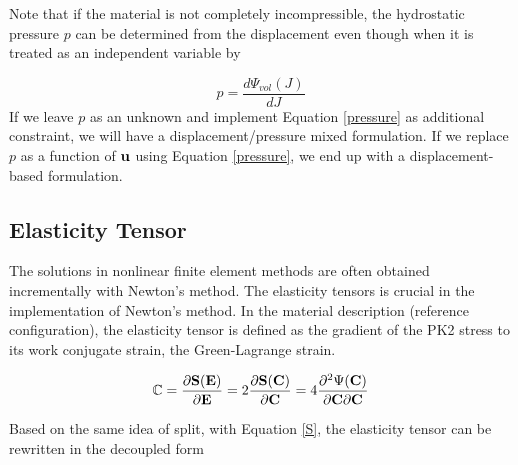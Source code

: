 Note that if the material is not completely incompressible, the hydrostatic pressure $p$ can be determined from the displacement even though when it is treated as an independent variable by

\begin{equation} \label{pressure}
p = \frac{d\Psi_{vol}(J)}{dJ}
\end{equation}
If we leave $p$ as an unknown and implement Equation \ref{pressure} as additional constraint, we will have a displacement/pressure mixed formulation. If we replace $p$ as a function of $\bold{u}$ using Equation \ref{pressure}, we end up with a displacement-based formulation.

%
\subsection{Elasticity Tensor} \label{general_elasticity}
The solutions in nonlinear finite element methods are often obtained incrementally with Newton's method. The elasticity tensors is crucial in the implementation of Newton's method.
In the material description (reference configuration), the elasticity tensor is defined as the gradient of the PK2 stress to its work conjugate strain, the Green-Lagrange strain.

\begin{equation}
\mathbb{C} = \frac{\partial{\bold{S}(\bold{E})}}{\partial{\bold{E}}} =  2\frac{\partial{\bold{S}(\bold{C})}} {\partial{\bold{C}}} = 4 \frac{\partial^2{\Psi(\bold{C})}}{{\partial{\bold{C}}}{\partial{\bold{C}}}}
\end{equation}

Based on the same idea of split, with Equation \ref{S}, the elasticity tensor can be rewritten in the decoupled form 

